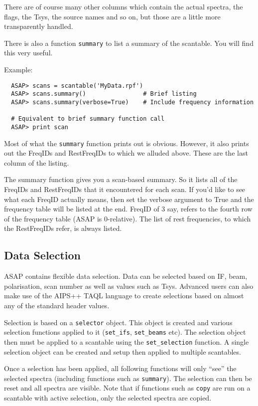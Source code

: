 \documentclass[11pt]{article}
\newcommand{\cmd}[1]{{\tt #1}}
\begin{document}
There are of course many other columns which contain the actual spectra,
the flags, the Tsys, the source names and so on, but those are a little
more transparently handled.

There is also a function \cmd{summary} to list a summary of the scantable.
You will find this very useful.

Example:

\begin{verbatim}
  ASAP> scans = scantable('MyData.rpf')
  ASAP> scans.summary()                # Brief listing
  ASAP> scans.summary(verbose=True)    # Include frequency information

  # Equivalent to brief summary function call
  ASAP> print scan
\end{verbatim}

Most of what the \cmd{summary} function  prints out is obvious. However,
it also prints out the FreqIDs and RestFreqIDs to which we alluded above.
These are the last column of the listing.

The summary function gives you a scan-based summary.  So it lists all of
the FreqIDs and RestFreqIDs that it encountered for each scan.  If you'd
like to see what each FreqID actually means, then set the verbose
argument to True and the frequency table will be listed at the end.
FreqID of 3 say, refers to the fourth row of the frequency table (ASAP
is 0-relative). The list of rest frequencies, to which the RestFreqIDs
refer, is always listed.

\subsection{Data Selection}
\label{sec:selection}

ASAP contains flexible data selection. Data can be selected based on
IF, beam, polarisation, scan number as well as values such as
Tsys. Advanced users can also make use of the AIPS++ TAQL language to
create selections based on almost any of the standard header values.

Selection is based on a \cmd{selector} object. This object is created
and various selection functions applied to it (\cmd{set\_ifs},
\cmd{set\_beams} etc). The selection object then must be applied to a
scantable using the \cmd{set\_selection} function. A single selection
object can be created and setup then applied to multiple scantables.

Once a selection has been applied, all following functions will only
``see'' the selected spectra (including functions such as
\cmd{summary}). The selection can then be reset and all spectra are
visible. Note that if functions such as \cmd{copy} are run on a
scantable with active selection, only the selected spectra are copied.
\end{document}
